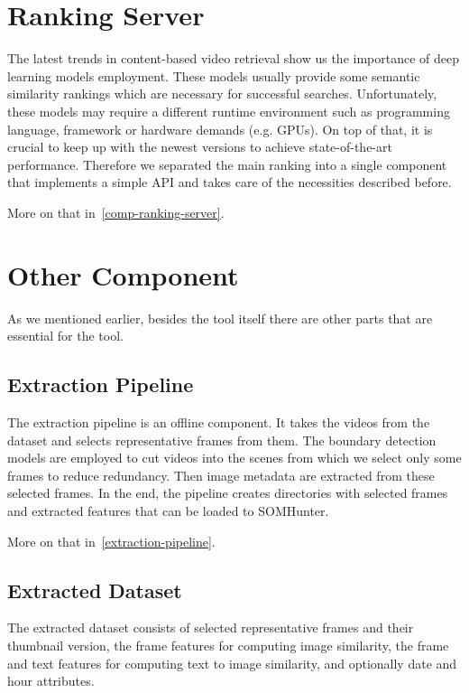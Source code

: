 \section{Ranking Server}

The latest trends in content-based video retrieval show us the importance of deep learning models employment. These models usually provide some semantic similarity rankings which are necessary for successful searches. Unfortunately, these models may require a different runtime environment such as programming language, framework or hardware demands (e.g. GPUs). On top of that, it is crucial to keep up with the newest versions to achieve state-of-the-art performance. Therefore we separated the main ranking into a single component that implements a simple API and takes care of the necessities described before.

More on that in~\cref{comp-ranking-server}.


\section{Other Component}
As we mentioned earlier, besides the tool itself there are other parts that are essential for the tool.

\subsection{Extraction Pipeline}

The extraction pipeline is an offline component. It takes the videos from the dataset and selects representative frames from them. The boundary detection models are employed to cut videos into the scenes from which we select only some frames to reduce redundancy. Then image metadata are extracted from these selected frames. In the end, the pipeline creates directories with selected frames and extracted features that can be loaded to SOMHunter.

More on that in~\cref{extraction-pipeline}.

\subsection{Extracted Dataset}

The extracted dataset consists of selected representative frames and their thumbnail version, the frame features for computing image similarity, the frame and text features for computing text to image similarity, and optionally date and hour attributes.

